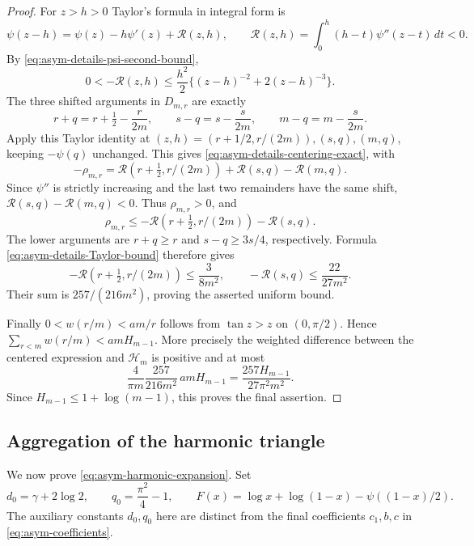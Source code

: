 \begin{proof}
For $z>h>0$ Taylor's formula in integral form is
\[
 \psi(z-h)=\psi(z)-h\psi'(z)+\mathcal R(z,h),\qquad
 \mathcal R(z,h)=\int_0^h(h-t)\psi''(z-t)\,dt<0.
\]
By \eqref{eq:asym-details-psi-second-bound},
\begin{equation}\label{eq:asym-details-Taylor-bound}
 0<-\mathcal R(z,h)
       \leq\frac{h^2}{2}\{(z-h)^{-2}+2(z-h)^{-3}\}.
\end{equation}
The three shifted arguments in $D_{m,r}$ are exactly
\[
 r+q=r+\tfrac12-\frac r{2m},\qquad
 s-q=s-\frac s{2m},\qquad m-q=m-\frac s{2m}.
\]
Apply this Taylor identity at
$(z,h)=(r+1/2,r/(2m)),(s,q),(m,q)$, keeping $-\psi(q)$
unchanged.  This gives \eqref{eq:asym-details-centering-exact},
with
\[
 -\rho_{m,r}=\mathcal R(r+\tfrac12,r/(2m))
                         +\mathcal R(s,q)-\mathcal R(m,q).
\]
Since $\psi''$ is strictly increasing and the last two remainders
have the same shift, $\mathcal R(s,q)-\mathcal R(m,q)<0$.
Thus $\rho_{m,r}>0$, and
\[
 \rho_{m,r}\leq-\mathcal R(r+\tfrac12,r/(2m))-\mathcal R(s,q).
\]
The lower arguments are $r+q\geq r$ and
$s-q\geq3s/4$, respectively.  Formula
\eqref{eq:asym-details-Taylor-bound} therefore gives
\[
 -\mathcal R(r+\tfrac12,r/(2m))\leq\frac3{8m^2},\qquad
 -\mathcal R(s,q)\leq\frac{22}{27m^2}.
\]
Their sum is $257/(216m^2)$, proving the asserted uniform bound.

Finally $0<w(r/m)<am/r$ follows from $\tan z>z$ on
$(0,\pi/2)$.  Hence $\sum_{r<m}w(r/m)<amH_{m-1}$.
More precisely the weighted difference between the centered expression
and $\mathcal H_m$ is positive and at most
\[
 \frac4{\pi m}\frac{257}{216m^2}\,amH_{m-1}
       =\frac{257H_{m-1}}{27\pi^2m^2}.
\]
Since $H_{m-1}\leq1+\log(m-1)$, this proves the final assertion.
\end{proof}

\subsection{Aggregation of the harmonic triangle}
\label{sec:asym-details-harmonic}

We now prove \eqref{eq:asym-harmonic-expansion}.  Set
\[
 d_0=\gamma+2\log2,\qquad q_0=\frac{\pi^2}{4}-1,
 \qquad
 F(x)=\log x+\log(1-x)-\psi((1-x)/2).
\]
The auxiliary constants $d_0,q_0$ here are distinct from the final
coefficients $c_1,b,c$ in \eqref{eq:asym-coefficients}.

